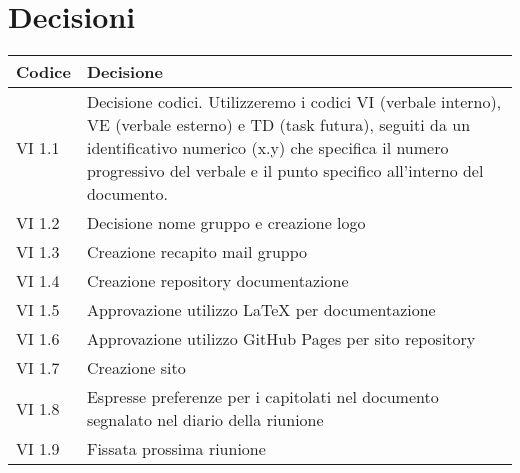 \section{Decisioni}

	\begin{table}[htbp]
		\begin{tabular}{|p{}|p{}|}
			\hline
			\rowcolor[gray]{0.9}
			Codice & Decisione \\
			\hline
			VI 1.1 & Decisione codici. Utilizzeremo i codici VI (verbale interno), VE (verbale esterno) e TD (task futura), seguiti da un identificativo numerico (x.y) che specifica il numero progressivo del verbale e il punto specifico all'interno del documento. \\
			\hline
			VI 1.2	& Decisione nome gruppo e creazione logo \\
			\hline
			VI 1.3 & Creazione recapito mail gruppo \\
			\hline
			VI 1.4 & Creazione repository documentazione \\
			\hline
			VI 1.5	& Approvazione utilizzo LaTeX per documentazione \\
			\hline
			VI 1.6 & Approvazione utilizzo GitHub Pages per sito repository \\
			\hline
			VI 1.7 & Creazione sito \\
			\hline
			VI 1.8 & Espresse preferenze per i capitolati nel documento segnalato nel diario della riunione \\
			\hline
			VI 1.9 & Fissata prossima riunione \\
			\hline
		\end{tabular}
	\end{table}
